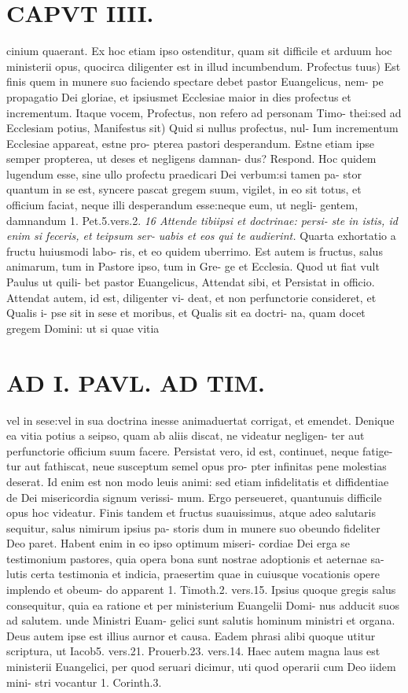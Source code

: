 \documentclass{article}
\begin{document}
\begin{pages}
\section*{CAPVT  IIII. }
\marginpar{[ p.237 ]}cinium quaerant. Ex hoc etiam ipso ostenditur, quam sit difficile et arduum hoc ministerii opus, quocirca diligenter est in illud incumbendum. Profectus tuus) Est finis quem in munere suo faciendo spectare debet pastor Euangelicus, nem- pe propagatio Dei gloriae, et ipsiusmet Ecclesiae maior in dies profectus et incrementum. Itaque vocem, Profectus, non refero ad personam Timo- thei:sed ad Ecclesiam potius, Manifestus sit) Quid si nullus profectus, nul- Ium incrementum Ecclesiae appareat, estne pro- pterea pastori desperandum. Estne etiam ipse semper propterea, ut deses et negligens damnan- dus? Respond. Hoc quidem lugendum esse, sine ullo profectu praedicari Dei verbum:si tamen pa- stor quantum in se est, syncere pascat gregem suum, vigilet, in eo sit totus, et officium faciat, neque illi desperandum esse:neque eum, ut negli- gentem, damnandum 1. Pet.5.vers.2. \textit{16 Attende tibiipsi et doctrinae: persi-} \textit{ste in istis, id enim si feceris, et teipsum ser-} \textit{uabis et eos qui te audierint.} Quarta exhortatio a fructu huiusmodi labo- ris, et eo quidem uberrimo. Est autem is fructus, salus animarum, tum in Pastore ipso, tum in Gre- ge et Ecclesia. Quod ut fiat vult Paulus ut quili- bet pastor Euangelicus, Attendat sibi, et Persistat in officio. Attendat autem, id est, diligenter vi- deat, et non perfunctorie consideret, et Qualis i- pse sit in sese et moribus, et Qualis sit ea doctri- na, quam docet gregem Domini: ut si quae vitia 
\section*{AD I. PAVL. AD TIM. }
\marginpar{[ p.230 ]}vel in sese:vel in sua doctrina inesse animaduertat corrigat, et emendet. Denique ea vitia potius a seipso, quam ab aliis discat, ne videatur negligen- ter aut perfunctorie officium suum facere. Persistat vero, id est, continuet, neque fatige- tur aut fathiscat, neue susceptum semel opus pro- pter infinitas pene molestias deserat. Id enim est non modo leuis animi: sed etiam infidelitatis et diffidentiae de Dei misericordia signum verissi- mum. Ergo perseueret, quantunuis difficile opus hoc videatur. Finis tandem et fructus suauissimus, atque adeo salutaris sequitur, salus nimirum ipsius pa- storis dum in munere suo obeundo fideliter Deo paret. Habent enim in eo ipso optimum miseri- cordiae Dei erga se testimonium pastores, quia opera bona sunt nostrae adoptionis et aeternae sa- lutis certa testimonia et indicia, praesertim quae in cuiusque vocationis opere implendo et obeum- do apparent 1. Timoth.2. vers.15. Ipsius quoque gregis salus consequitur, quia ea ratione et per ministerium Euangelii Domi- nus adducit suos ad salutem. unde Ministri Euam- gelici sunt salutis hominum ministri et organa. Deus autem ipse est illius aurnor et causa. Eadem phrasi alibi quoque utitur scriptura, ut Iacob5. vers.21. Prouerb.23. vers.14. Haec autem magna laus est ministerii Euangelici, per quod seruari dicimur, uti quod operarii cum Deo iidem mini- stri vocantur 1. Corinth.3. 

\end{pages}
\end{document}
